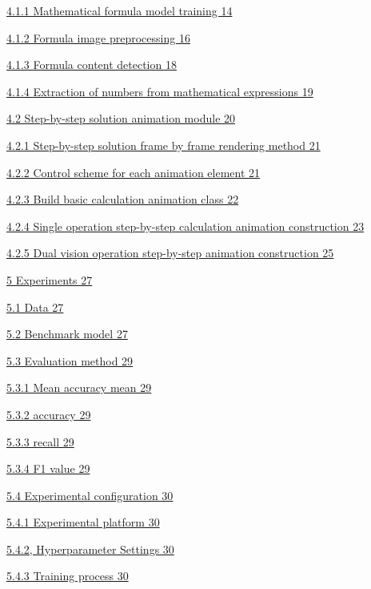 \documentclass[
]{article}
\begin{document}
\hyperref[mathematical-equation-model-training]{4.1.1 Mathematical
formula model training 14}

\hyperref[formula-image-preprocessing]{4.1.2 Formula image preprocessing
16}

\hyperref[formula-content-detection]{4.1.3 Formula content detection 18}

\hyperref[mathematical-formula-number-extraction]{4.1.4 Extraction of
numbers from mathematical expressions 19}

\hyperref[step-by-step-solution-animation-module]{4.2 Step-by-step
solution animation module 20}

\hyperref[step-by-step-solution-frame-by-frame-rendering-method]{4.2.1
Step-by-step solution frame by frame rendering method 21}

\hyperref[the-control-scheme-for-each-animation-element]{4.2.2 Control
scheme for each animation element 21}

\hyperref[build-basic-formula-animation-class]{4.2.3 Build basic
calculation animation class 22}

\hyperref[monocular-operation-is-divided-into-step-by-step-animation-construction]{4.2.4
Single operation step-by-step calculation animation construction 23}

\hyperref[two-eye-operation-is-divided-into-step-by-step-animation-construction]{4.2.5
Dual vision operation step-by-step animation construction 25}

\hyperref[experiment]{5 Experiments 27}

\hyperref[data]{5.1 Data 27}

\hyperref[benchmark-model]{5.2 Benchmark model 27}

\hyperref[appraisal-procedure]{5.3 Evaluation method 29}

\hyperref[mean-average-accuracy]{5.3.1 Mean accuracy mean 29}

\hyperref[accuracy]{5.3.2 accuracy 29}

\hyperref[recall]{5.3.3 recall 29}

\hyperref[f1-value]{5.3.4 F1 value 29}

\hyperref[experimental-configuration]{5.4 Experimental configuration 30}

\hyperref[experimental-platform]{5.4.1 Experimental platform 30}

\hyperref[hyperparameter-settings]{5.4.2, Hyperparameter Settings 30}

\hyperref[training-process]{5.4.3 Training process 30}
\end{document}
